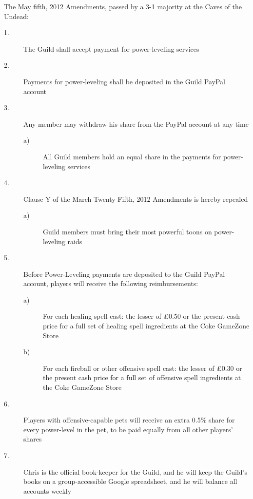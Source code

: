 \tb

The May fifth, 2012 Amendments, passed by a 3-1 majority at the Caves 
of the Undead:

\begin{description}
\item[1.] The Guild shall accept payment for power-leveling services

\item[2.] Payments for power-leveling shall be deposited in the Guild PayPal 
account

\item[3.] Any member may withdraw his share from the PayPal account at any time

\begin{description}
\item[a)] All Guild members hold an equal share in 
the payments for power-leveling services 
\end{description}

\item[4.] Clause Y of the March Twenty Fifth, 2012 Amendments is hereby 
repealed

\begin{description}
\item[a)] Guild members must bring their most 
powerful toons on power-leveling raids 
\end{description}

\item[5.] Before Power-Leveling payments are deposited to the Guild PayPal 
account, players will receive the following reimbursements:

\begin{description}
\item[a)] For each healing spell cast: the lesser 
of \strangesymbol\pounds0.50 or the present cash price for a full set of healing 
spell ingredients at the Coke GameZone Store 

\item[b)] For each fireball or other offensive 
spell cast: the lesser of \strangesymbol\pounds0.30 or the present cash price for a 
full set of offensive spell ingredients at the Coke GameZone Store 

\end{description}

\item[6.] Players with offensive-capable pets will receive an extra 0.5\% 
share for every power-level in the pet, to be paid equally from all 
other players' shares

\item[7.] Chris is the official book-keeper for the Guild, and he will keep 
the Guild's books on a group-accessible Google spreadsheet, and he will 
balance all accounts weekly
\end{description}

